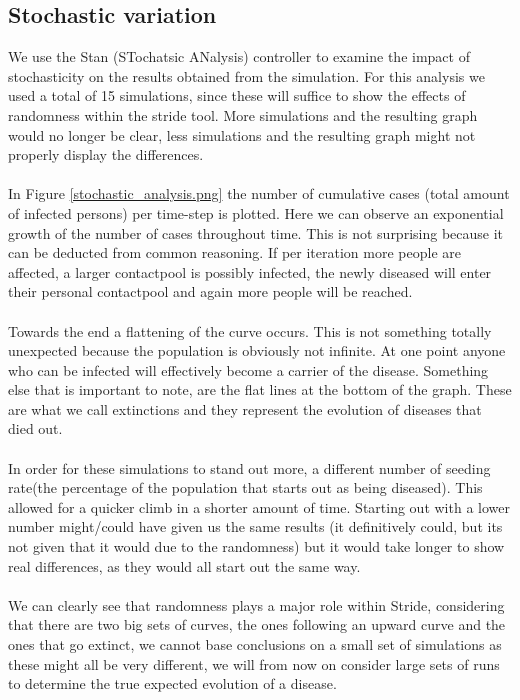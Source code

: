 \documentclass[runningheads]{llncs}
\begin{document}
	\subsection{Stochastic variation}
	We use the Stan (STochatsic ANalysis) controller to examine the impact of stochasticity on the results obtained from the simulation. For this analysis we used a total of 15 simulations, since these will suffice to show the effects of randomness within the stride tool. More simulations and the resulting graph would no longer be clear, less simulations and the resulting graph might not properly display the differences.\\ 
	\\
	In Figure \ref{stochastic_analysis.png} the number of cumulative cases (total amount of infected persons) per time-step is plotted. Here we can observe an exponential growth of the number of cases throughout time. This is not surprising because it can be deducted from common reasoning. If per iteration more people are affected, a larger contactpool is possibly infected, the newly diseased will enter their personal contactpool and again more people will be reached.\\ 
	\\
	Towards the end a flattening of the curve occurs. This is not something totally unexpected because the population is obviously not infinite. At one point anyone who can be infected will effectively become a carrier of the disease. Something else that is important to note, are the flat lines at the bottom of the graph. These are what we call extinctions and they represent the evolution of diseases that died out.\\ 
	\\
	In order for these simulations to stand out more, a different number of seeding rate(the percentage of the population that starts out as being diseased). This allowed for a quicker climb in a shorter amount of time. Starting out with a lower number might/could have given us the same results (it definitively could, but its not given that it would due to the randomness) but it would take longer to show real differences, as they would all start out the same way.\\
	\\
	We can clearly see that randomness plays a major role within Stride, considering that there are two big sets of curves, the ones following an upward curve and the ones that go extinct, we cannot base conclusions on a small set of simulations as these might all be very different, we will from now on consider large sets of runs to determine the true expected evolution of a disease.\\
	
\end{document}
